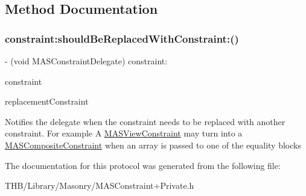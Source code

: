 \subsection{Method Documentation}
\mbox{\label{protocol_m_a_s_constraint_delegate_01-p_a39a785b8c164b33e76bafcf4c5c4d36d}} 
\subsubsection{\texorpdfstring{constraint\+:should\+Be\+Replaced\+With\+Constraint\+:()}{constraint:shouldBeReplacedWithConstraint:()}}
{\footnotesize\ttfamily -\/ (void M\+A\+S\+Constraint\+Delegate) constraint\+: \begin{DoxyParamCaption}\item[{(\mbox{\hyperlink{interface_m_a_s_constraint}{M\+A\+S\+Constraint}} $\ast$)}]{constraint }\item[{shouldBeReplacedWithConstraint:(\mbox{\hyperlink{interface_m_a_s_constraint}{M\+A\+S\+Constraint}} $\ast$)}]{replacement\+Constraint }\end{DoxyParamCaption}}

Notifies the delegate when the constraint needs to be replaced with another constraint. For example A \mbox{\hyperlink{interface_m_a_s_view_constraint}{M\+A\+S\+View\+Constraint}} may turn into a \mbox{\hyperlink{interface_m_a_s_composite_constraint}{M\+A\+S\+Composite\+Constraint}} when an array is passed to one of the equality blocks 

The documentation for this protocol was generated from the following file\+:\begin{DoxyCompactItemize}
\item 
T\+H\+B/\+Library/\+Masonry/M\+A\+S\+Constraint+\+Private.\+h\end{DoxyCompactItemize}

